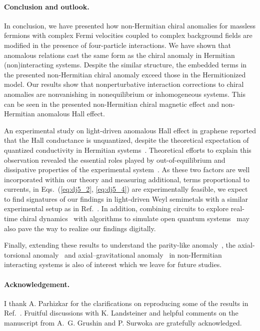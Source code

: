 \documentclass[prl,aps,showpacs,twocolumn,preprintnumbers,
amsmath,amssymb,superscriptaddress,longbibliography]{revtex4-1}
\begin{document}
\paragraph*{Conclusion and outlook.}
In conclusion, we have presented how non-Hermitian chiral anomalies for massless fermions with complex Fermi velocities coupled to complex background fields are modified in the presence of four-particle interactions. We have shown that anomalous relations cast the same form as the chiral anomaly in Hermitian (non)interacting systems. Despite the similar structure, the embedded terms in the presented non-Hermitian chiral anomaly exceed those in the Hermitionized model. Our results show that nonperturbative interaction corrections to chiral anomalies are nonvanishing in nonequilibrium or inhomogeneous systems. This can be seen in the presented non-Hermitian chiral magnetic effect and non-Hermitian anomalous Hall effect. 

An experimental study on light-driven anomalous Hall effect in graphene reported that the Hall conductance is unquantized, despite the theoretical expectation of quantized conductivity in Hermitian systems~\cite{Mciver2020}. Theoretical efforts to explain this observation revealed the essential roles played by out-of-equilibrium and dissipative properties of the experimental system~\cite{Sato2019, Nuske2020}. As these two factors are well incorporated within our theory and measuring additional, terms proportional to currents, in Eqs.~(\ref{eq:dj5_2}, \ref{eq:dj5_4}) are experimentally feasible, we expect to find signatures of our findings in light-driven Weyl semimetals with a similar experimental setup as in Ref.~\cite{Mciver2020}. In addition, combining circuits to explore real-time chiral dynamics~\cite{Kharzeev2020} with algorithms to simulate open quantum systems~\cite{Kamakari2022} may also pave the way to realize our findings digitally.

Finally, extending these results to understand the parity-like anomaly~\cite{Burkov2018, Matsushita2020}, the axial-torsional anomaly~\cite{Ferreiros2019} and axial–gravitational anomaly~\cite{Gooth2017, Chernodub2021} in non-Hermitian interacting systems is also of interest which we leave for future studies.

\paragraph*{Acknowledgement.} I thank A. Parhizkar for the clarifications on reproducing some of the results in Ref.~\cite{Parhizkar2023}. 
Fruitful discussions with K. Landsteiner and helpful comments on the manuscript from A.~G. Grushin and P. Surwoka are gratefully acknowledged.


\end{document}
